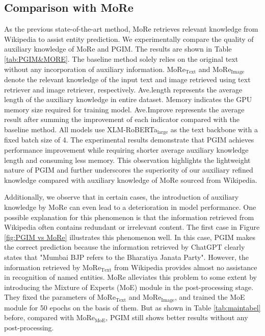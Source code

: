 \documentclass[11pt]{article}
\begin{document}
\subsection{Comparison with MoRe}

As the previous state-of-the-art method, MoRe retrieves relevant knowledge from Wikipedia to assist entity prediction. We experimentally compare the quality of auxiliary knowledge of MoRe and PGIM. The results are shown in Table \ref{tab:PGIM&MORE}. The baseline method solely relies on the original text without any incorporation of auxiliary information. 
MoRe$_{\text{Text}}$ and MoRe$_{\text{Image}}$ denote the relevant knowledge of the input text and image retrieved using text retriever and image retriever, respectively. 
Ave.length represents the average length of the auxiliary knowledge in entire dataset. Memory indicates the GPU memory size required for training model. Ave.Improve represents the average result after summing the improvement of each indicator compared with the baseline method. All models use XLM-RoBERTa$_\text{large}$ \citep{conneau2019unsupervised} as the text backbone with a fixed batch size of 4. 
The experimental results demonstrate that PGIM achieves performance improvement while requiring shorter average auxiliary knowledge length and consuming less memory. This observation highlights the lightweight nature of PGIM and further underscores the superiority of our auxiliary refined knowledge compared with auxiliary knowledge of MoRe sourced from Wikipedia. 

Additionally, we observe that in certain cases, the introduction of auxiliary knowledge by MoRe can even lead to a deterioration in model performance. One possible explanation for this phenomenon is that the information retrieved from Wikipedia often contains redundant or irrelevant content. 
The first case in Figure \ref{fig:PGIM vs MoRe} illustrates this phenomenon well. In this case, PGIM makes the correct prediction because the information retrieved by ChatGPT clearly states that "Mumbai BJP refers to the Bharatiya Janata Party". However, the information retrieved by MoRe$_{\text{Text}}$ from Wikipedia provides almost no assistance in recognition of named entities. 
MoRe alleviates this problem to some extent by introducing the Mixture of Experts (MoE) module in the post-processing stage.
They fixed the parameters of MoRe$_{\text{Text}}$ and MoRe$_{\text{Image}}$, and trained the MoE module for 50 epochs on the basis of them. But as shown in Table \ref{tab:maintabel} before, compared with MoRe$_{\text{MoE}}$, PGIM still shows better results without any post-processing.
\end{document}

